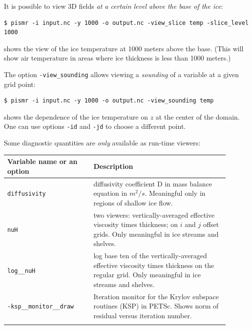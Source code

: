 \documentclass[11pt,final]{amsart}
\newcommand{\und}{\_\!\_}
\newcommand{\pismoptionindex}[1]{\index{options for PISM (and PETSc)!\texttt{-#1}}}
\newcommand{\intextoption}[1]{\texttt{-#1}\pismoptionindex{#1}}
\begin{document}
It is possible to view 3D fields \emph{at a certain level above the base of the ice}:
\begin{verbatim}
$ pismr -i input.nc -y 1000 -o output.nc -view_slice temp -slice_level 1000
\end{verbatim}
shows the view of the ice temperature at 1000 meters above the base. (This will show air temperature in areas where ice thickness is less than 1000 meters.)

The option \verb|-view_sounding| allows viewing a \emph{sounding} of a variable at a given grid point:
\begin{verbatim}
$ pismr -i input.nc -y 1000 -o output.nc -view_sounding temp
\end{verbatim}
shows the dependence of the ice temperature on $z$ at the center of the domain. One can use options \verb|-id| and \verb|-jd| to choose a different point.

Some diagnostic quantities are \emph{only} available as run-time viewers:
\begin{center}
  \begin{tabular}{p{0.35\linewidth}p{0.55\linewidth}}\hline
    \small
    \textbf{Variable name or an option} & \textbf{Description}\\\hline
    \texttt{diffusivity} & diffusivity coefficient D in mass balance equation in $m^{2}/s$. Meaningful only in regions of shallow ice ﬂow.\\
    \texttt{nuH} & two viewers: vertically-averaged effective viscosity times thickness; on $i$ and $j$ offset grids. Only meaningful in ice streams and shelves.\\
    \texttt{log\und nuH} & log base ten of the vertically-averaged effective viscosity times thickness on the regular grid. Only meaningful in ice streams and shelves.\\
    \intextoption{ksp\und monitor\und draw} & Iteration monitor for the Krylov subspace routines (KSP) in PETSc. Shows norm of residual versus iteration number.\\
    \normalsize
  \end{tabular}
\end{center}
\end{document}
